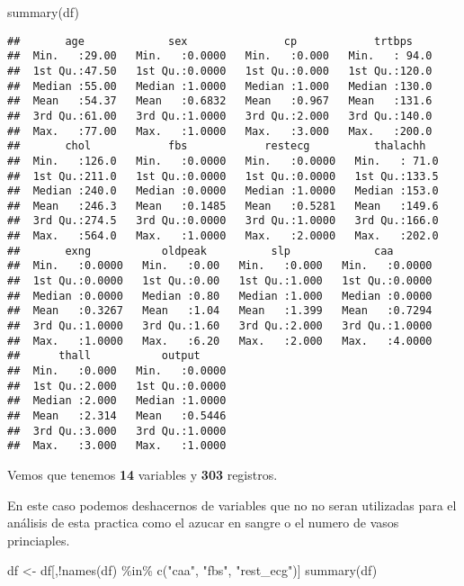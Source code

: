 \documentclass[
]{article}
\newenvironment{Shaded}{\begin{snugshade}}{\end{snugshade}}
\newcommand{\FunctionTok}[1]{\textcolor[rgb]{0.94,0.94,0.56}{#1}}
\newcommand{\NormalTok}[1]{\textcolor[rgb]{0.80,0.80,0.80}{#1}}
\newcommand{\OtherTok}[1]{\textcolor[rgb]{0.94,0.94,0.56}{#1}}
\newcommand{\SpecialCharTok}[1]{\textcolor[rgb]{0.86,0.64,0.64}{#1}}
\newcommand{\StringTok}[1]{\textcolor[rgb]{0.80,0.58,0.58}{#1}}
\begin{document}
\begin{Shaded}
\begin{Highlighting}[]
\FunctionTok{summary}\NormalTok{(df)}
\end{Highlighting}
\end{Shaded}

\begin{verbatim}
##       age             sex               cp            trtbps     
##  Min.   :29.00   Min.   :0.0000   Min.   :0.000   Min.   : 94.0  
##  1st Qu.:47.50   1st Qu.:0.0000   1st Qu.:0.000   1st Qu.:120.0  
##  Median :55.00   Median :1.0000   Median :1.000   Median :130.0  
##  Mean   :54.37   Mean   :0.6832   Mean   :0.967   Mean   :131.6  
##  3rd Qu.:61.00   3rd Qu.:1.0000   3rd Qu.:2.000   3rd Qu.:140.0  
##  Max.   :77.00   Max.   :1.0000   Max.   :3.000   Max.   :200.0  
##       chol            fbs            restecg          thalachh    
##  Min.   :126.0   Min.   :0.0000   Min.   :0.0000   Min.   : 71.0  
##  1st Qu.:211.0   1st Qu.:0.0000   1st Qu.:0.0000   1st Qu.:133.5  
##  Median :240.0   Median :0.0000   Median :1.0000   Median :153.0  
##  Mean   :246.3   Mean   :0.1485   Mean   :0.5281   Mean   :149.6  
##  3rd Qu.:274.5   3rd Qu.:0.0000   3rd Qu.:1.0000   3rd Qu.:166.0  
##  Max.   :564.0   Max.   :1.0000   Max.   :2.0000   Max.   :202.0  
##       exng           oldpeak          slp             caa        
##  Min.   :0.0000   Min.   :0.00   Min.   :0.000   Min.   :0.0000  
##  1st Qu.:0.0000   1st Qu.:0.00   1st Qu.:1.000   1st Qu.:0.0000  
##  Median :0.0000   Median :0.80   Median :1.000   Median :0.0000  
##  Mean   :0.3267   Mean   :1.04   Mean   :1.399   Mean   :0.7294  
##  3rd Qu.:1.0000   3rd Qu.:1.60   3rd Qu.:2.000   3rd Qu.:1.0000  
##  Max.   :1.0000   Max.   :6.20   Max.   :2.000   Max.   :4.0000  
##      thall           output      
##  Min.   :0.000   Min.   :0.0000  
##  1st Qu.:2.000   1st Qu.:0.0000  
##  Median :2.000   Median :1.0000  
##  Mean   :2.314   Mean   :0.5446  
##  3rd Qu.:3.000   3rd Qu.:1.0000  
##  Max.   :3.000   Max.   :1.0000
\end{verbatim}

Vemos que tenemos \textbf{14} variables y \textbf{303} registros.

En este caso podemos deshacernos de variables que no no seran utilizadas
para el análisis de esta practica como el azucar en sangre o el numero
de vasos princiaples.

\begin{Shaded}
\begin{Highlighting}[]
\NormalTok{df }\OtherTok{\textless{}{-}}\NormalTok{ df[,}\SpecialCharTok{!}\FunctionTok{names}\NormalTok{(df) }\SpecialCharTok{\%in\%} \FunctionTok{c}\NormalTok{(}\StringTok{"caa"}\NormalTok{, }\StringTok{"fbs"}\NormalTok{, }\StringTok{"rest\_ecg"}\NormalTok{)]}
\FunctionTok{summary}\NormalTok{(df)}
\end{Highlighting}
\end{Shaded}
\end{document}
